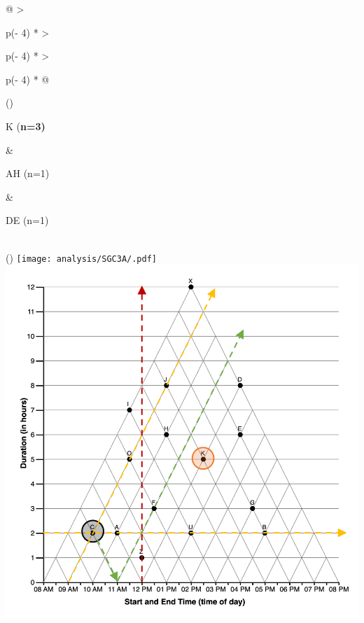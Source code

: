 \documentclass[
  letterpaper,
  DIV=11,
  numbers=noendperiod]{scrreprt}
\begin{document}
\begin{longtable}[]{@{}
  >{\raggedright\arraybackslash}p{(\columnwidth - 4\tabcolsep) * }
  >{\raggedright\arraybackslash}p{(\columnwidth - 4\tabcolsep) * }
  >{\raggedright\arraybackslash}p{(\columnwidth - 4\tabcolsep) * }@{}}
\toprule()
\begin{minipage}[b]{\linewidth}\raggedright
K (\textbf{n=3)}
\end{minipage} & \begin{minipage}[b]{\linewidth}\raggedright
AH (n=1)
\end{minipage} & \begin{minipage}[b]{\linewidth}\raggedright
DE (n=1)
\end{minipage} \\
\midrule()
\endhead
\texttt{[image: analysis/SGC3A/.pdf]}\includegraphics{analysis/SGC3A/static/interpretations/Q3_111_K.png}

\end{longtable}
\end{document}
